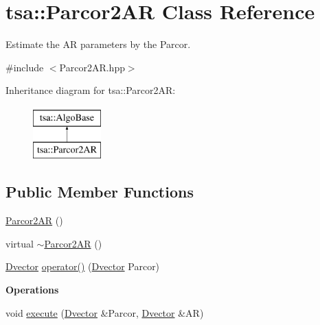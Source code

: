 \hypertarget{classtsa_1_1_parcor2_a_r}{}\section{tsa\+:\+:Parcor2\+AR Class Reference}
\label{classtsa_1_1_parcor2_a_r}


Estimate the AR parameters by the Parcor.  




{\ttfamily \#include $<$Parcor2\+A\+R.\+hpp$>$}

Inheritance diagram for tsa\+:\+:Parcor2\+AR\+:\begin{figure}[H]
\begin{center}
\leavevmode
\includegraphics[height=2.000000cm]{classtsa_1_1_parcor2_a_r}
\end{center}
\end{figure}
\subsection*{Public Member Functions}
\begin{DoxyCompactItemize}
\item 
\hyperlink{classtsa_1_1_parcor2_a_r_a071a1e9ef52185df08d6889937bf4a15}{Parcor2\+AR} ()
\item 
virtual \hyperlink{classtsa_1_1_parcor2_a_r_a048e923396810067505a8a18ca95ec3a}{$\sim$\+Parcor2\+AR} ()
\item 
\hyperlink{namespacetsa_a8900fb03d849baf447a1a0efe2561fb2}{Dvector} \hyperlink{classtsa_1_1_parcor2_a_r_aa87caf6b20cdb03a33fddf7e8c9beeef}{operator()} (\hyperlink{namespacetsa_a8900fb03d849baf447a1a0efe2561fb2}{Dvector} Parcor)
\end{DoxyCompactItemize}
\begin{Indent}\textbf{ Operations}\par
\begin{DoxyCompactItemize}
\item 
void \hyperlink{classtsa_1_1_parcor2_a_r_a0a761baa7118ecfe61e612c1ae27a360}{execute} (\hyperlink{namespacetsa_a8900fb03d849baf447a1a0efe2561fb2}{Dvector} \&Parcor, \hyperlink{namespacetsa_a8900fb03d849baf447a1a0efe2561fb2}{Dvector} \&AR)
\end{DoxyCompactItemize}
\end{Indent}


